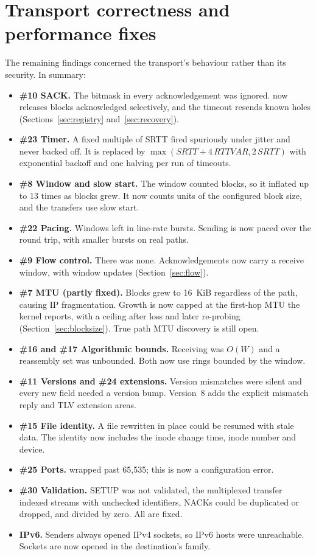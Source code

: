 \section{Transport correctness and performance fixes}

The remaining findings concerned the transport's behaviour rather than its security. In summary:
\begin{itemize}
  \item \textbf{\#10 SACK.} The bitmask in every acknowledgement was ignored.  now releases
    blocks acknowledged selectively, and the timeout resends known holes (Sections~\ref{sec:registry}
    and~\ref{sec:recovery}).
  \item \textbf{\#23 Timer.} A fixed multiple of SRTT fired spuriously under jitter and never backed off. It is
    replaced by $\max(\mathit{SRTT}+4\,\mathit{RTTVAR},2\,\mathit{SRTT})$ with exponential backoff and one
    halving per run of timeouts.
  \item \textbf{\#8 Window and slow start.} The window counted blocks, so it inflated up to 13 times as blocks
    grew. It now counts units of the configured block size, and the transfers use slow start.
  \item \textbf{\#22 Pacing.} Windows left in line-rate bursts. Sending is now paced over the round trip, with
    smaller bursts on real paths.
  \item \textbf{\#9 Flow control.} There was none. Acknowledgements now carry a receive window, with window
    updates (Section~\ref{sec:flow}).
  \item \textbf{\#7 MTU (partly fixed).} Blocks grew to 16~KiB regardless of the path, causing IP
    fragmentation. Growth is now capped at the first-hop MTU the kernel reports, with a ceiling after loss and
    later re-probing (Section~\ref{sec:blocksize}). True path MTU discovery is still open.
  \item \textbf{\#16 and \#17 Algorithmic bounds.} Receiving was $O(W)$ and a reassembly set was unbounded. Both
    now use rings bounded by the window.
  \item \textbf{\#11 Versions and \#24 extensions.} Version mismatches were silent and every new field needed a
    version bump. Version~8 adds the explicit mismatch reply and TLV extension areas.
  \item \textbf{\#15 File identity.} A file rewritten in place could be resumed with stale data. The identity now
    includes the inode change time, inode number and device.
  \item \textbf{\#25 Ports.}  wrapped past 65,535; this is now a configuration error.
  \item \textbf{\#30 Validation.} SETUP was not validated, the multiplexed transfer indexed streams with
    unchecked identifiers, NACKs could be duplicated or dropped, and  divided by zero. All are
    fixed.
  \item \textbf{IPv6.} Senders always opened IPv4 sockets, so IPv6 hosts were unreachable. Sockets are now opened
    in the destination's family.
\end{itemize}

